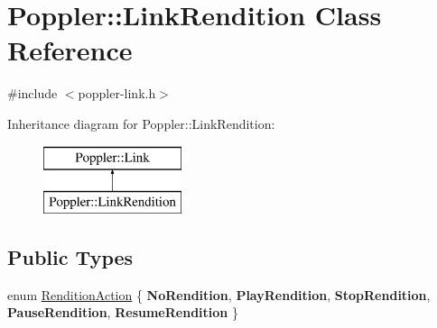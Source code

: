 \hypertarget{class_poppler_1_1_link_rendition}{}\section{Poppler\+:\+:Link\+Rendition Class Reference}
\label{class_poppler_1_1_link_rendition}


{\ttfamily \#include $<$poppler-\/link.\+h$>$}

Inheritance diagram for Poppler\+:\+:Link\+Rendition\+:\begin{figure}[H]
\begin{center}
\leavevmode
\includegraphics[height=2.000000cm]{class_poppler_1_1_link_rendition}
\end{center}
\end{figure}
\subsection*{Public Types}
\begin{DoxyCompactItemize}
\item 
enum \hyperlink{class_poppler_1_1_link_rendition_aede1a6b7156fe8973bdbeda39173704d}{Rendition\+Action} \{ \newline
{\bfseries No\+Rendition}, 
{\bfseries Play\+Rendition}, 
{\bfseries Stop\+Rendition}, 
{\bfseries Pause\+Rendition}, 
\newline
{\bfseries Resume\+Rendition}
 \}
\end{DoxyCompactItemize}
